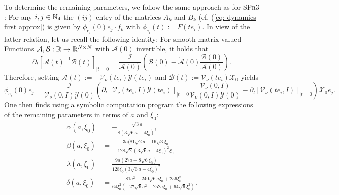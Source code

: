 To determine the remaining parameters, we follow the same approach as for \textsc{SPr3} \cite{Alouges2020}: For any $i, j \in \mathbb{N}_4$ the $(ij)$-entry of the matrices $A_k$ and $B_k$ (cf. (\ref{eq: dynamics first approx}) is given by $\dot{\phi}_{e_i}(0)e_j \cdot f_k$ with $\phi_{e_i}(t) := F(t e_i)$. In view of the latter relation, let us recall the following identity: For smooth matrix valued Functions $\mathcal{A}, \mathcal{B}: \mathbb{R} \to \mathbb{R}^{N \times N}$ with $\mathcal{A}(0)$ invertible, it holds that
\begin{equation}
\partial_t[\mathcal{A}(t)^{-1} \mathcal{B}(t)]_{\mid t = 0} = \frac{\mathcal{I}}{\mathcal{A}(0)}\left ( \dot{\mathcal{B}}(0) - \dot{\mathcal{A}}(0) \frac{\mathcal{B}(0)}{\mathcal{A}(0)}\right ).
\end{equation}
Therefore, setting $\mathcal{A}(t) := - \mathcal{V}_{\nu}(t e_i)\mathcal{Y}(t e_i)$ and $\mathcal{B}(t) := \mathcal{V}_{\nu}(t e_i) \mathcal{X}_0$ yields
\begin{equation}
\dot{\phi}_{e_i}(0)e_j = \frac{\mathcal{I}}{\mathcal{V}_\nu (0, I) \mathcal{Y}(0)} \left ( \partial_t [\mathcal{V}_{\nu}(t e_i, I) \mathcal{Y}(t e_i)]_{\mid t = 0} \frac{\mathcal{V}_{\nu}(0, I)}{\mathcal{V}_{\nu}(0, I) \mathcal{Y}(0)} - \partial_t[\mathcal{V}_{\nu}(t e_i, I)]_{\mid t = 0}\right ) \mathcal{X}_0 e_j.
\end{equation}
One then finds using a symbolic computation program the following expressions of the remaining parameters in terms of $a$ and $\xi_0$:
\begin{align}
\alpha(a, \xi_0) &= -\frac{\sqrt{3} a}{8(3 \sqrt{6} a - 4 \xi_0)^2}\\
\beta(a, \xi_0) &= - \frac{3 a( 81 \sqrt{2} a - 16 \sqrt{3} \xi_0}{128 \sqrt{2} (3 \sqrt{6} a - 4 \xi_0)^2 \xi_0}\\
\lambda(a, \xi_0) &= \frac{9 a (27 a - 8 \sqrt{6} \xi_0)}{128 \xi_0 (3 \sqrt{6} a - 4 \xi_0)^2}\\
\delta(a, \xi_0) &= \frac{81 a^2 - 240 \sqrt{6} a \xi_0 + 256 \xi_0^2}{64 \xi_0^2(-27 \sqrt{6} a^2 - 252 a \xi_0 + 64 \sqrt{6} \xi_0^2)}.
\end{align}




